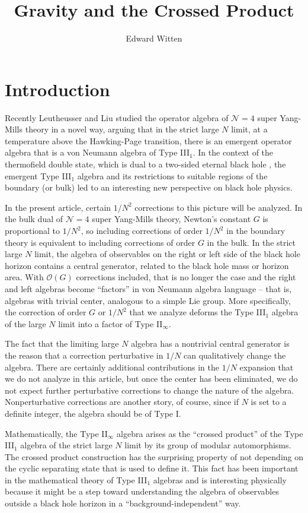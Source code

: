 \documentclass[11pt,a4paper]{article}
\title{Gravity and the Crossed Product}
\author{Edward Witten}
\affiliation{School of Natural Sciences, Institute for Advanced Study,\\ 1 Einstein Drive, Princeton, NJ 08540 USA}
\def\O{{\mathcal O}}
\def\N{{\mathcal N}}
\begin{document}
\maketitle

\section{Introduction}\label{intro} 

Recently  Leutheusser and Liu \cite{LL,LL2}  studied the operator algebra of $\N=4$ super Yang-Mills theory in a novel way, arguing
that in the strict large $N$ limit, at a temperature above the Hawking-Page transition, there is an emergent operator algebra that is a von Neumann algebra of Type III$_1$.  
In the context of the thermofield double state, which is dual to a two-sided eternal black hole \cite{Malda}, the emergent Type III$_1$ algebra
and its restrictions to suitable regions of the boundary (or bulk) led to an interesting new perspective on black hole physics.

In the present article, certain $1/N^2$ corrections to this picture will be analyzed.   In the bulk dual of $\N=4$ super Yang-Mills theory, Newton's constant $G$
is proportional to $1/N^2$, so including corrections of order $1/N^2$ in the boundary theory is equivalent to including corrections of order $G$ in the bulk.
In the strict large $N$ limit, the algebra of observables on the right or left side of the black hole horizon contains a central generator, related to the black hole mass or
horizon area.   With $\O(G)$ corrections included, that is no longer the case and the right and left algebras become 
 ``factors'' in von Neumann algebra language -- that is, algebras with trivial center, analogous to a simple Lie group.
More specifically, the correction of order $G$ or $1/N^2$ that we analyze deforms the Type III$_1$ algebra of the large $N$ limit into a factor of Type II$_\infty$.  

The fact that the limiting large $N$ algebra has a nontrivial central generator is the reason that a correction perturbative in $1/N$ can qualitatively change  the algebra.
There are certainly additional contributions in the $1/N$ expansion that we do not analyze in this article, but once the center
has been eliminated, we do not expect further perturbative corrections to change the nature of the algebra.  Nonperturbative corrections are another story,
of course, since if $N$ is set to a definite integer, the algebra should be of Type I.

Mathematically, the Type II$_\infty$ algebra arises as the ``crossed product'' of the Type III$_1$ algebra of the  strict large $N$ limit by its group of modular automorphisms.
The crossed product construction has the surprising property of not depending on the cyclic separating state that is used to define it.
This fact has been important in the mathematical theory of Type III$_1$ algebras
\cite{Takesaki,Connes,ConnesBook} and is interesting physically because it might be a step toward understanding the algebra of observables outside a black
hole horizon in a ``background-independent'' way.
\end{document}
